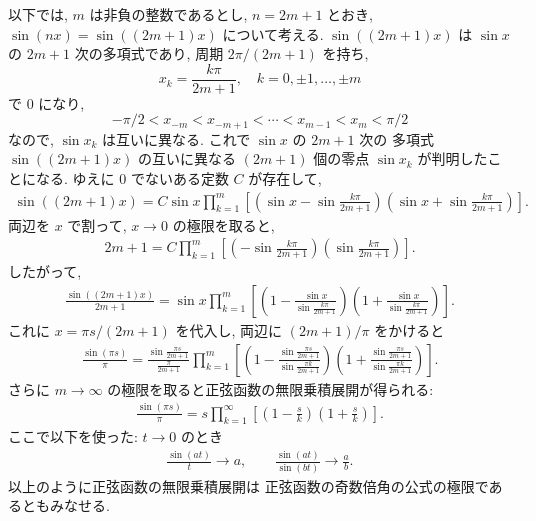 \documentclass[12pt,twoside]{jarticle}
\theoremstyle{jplain}
\theoremstyle{jplain}
\theoremstyle{jplain}
\numberwithin{theorem}{section}
\numberwithin{equation}{section}
\numberwithin{figure}{section}
\numberwithin{table}{section}
\begin{document}
以下では, $m$ は非負の整数であるとし, $n=2m+1$ とおき,
$\sin(nx)=\sin((2m+1)x)$ について考える.
$\sin((2m+1)x)$ は $\sin x$ の $2m+1$ 次の多項式であり,
周期 $2\pi/(2m+1)$ を持ち,
\begin{equation*}
x_k = \frac{k\pi}{2m+1}, \quad k=0,\pm1,\ldots,\pm m
\end{equation*}
で $0$ になり,
\begin{equation*}
  -\pi/2<x_{-m}<x_{-m+1}<\cdots<x_{m-1}<x_m<\pi/2
\end{equation*}
なので, $\sin x_k$ は互いに異なる. これで $\sin x$ の $2m+1$ 次の
多項式 $\sin((2m+1)x)$ の互いに異なる $(2m+1)$ 個の零点 $\sin x_k$
が判明したことになる. ゆえに $0$ でないある定数 $C$ が存在して,
\begin{align*}
  \sin((2m+1)x) =
  C \sin x
  \prod_{k=1}^m
  \left[
  \left(\sin x - \sin\frac{k\pi}{2m+1}\right)
  \left(\sin x + \sin\frac{k\pi}{2m+1}\right)
  \right].
\end{align*}
両辺を $x$ で割って, $x\to 0$ の極限を取ると,
\begin{align*}
  2m+1 = C
  \prod_{k=1}^m
  \left[
  \left(-\sin\frac{k\pi}{2m+1}\right)
  \left(\sin\frac{k\pi}{2m+1}\right)
  \right].
\end{align*}
したがって,
\begin{align*}
  \frac{\sin((2m+1)x)}{2m+1} =
  \sin x
  \prod_{k=1}^m
  \left[
  \left(1-\frac{\sin x}{\sin\frac{k\pi}{2m+1}}\right)
  \left(1+\frac{\sin x}{\sin\frac{k\pi}{2m+1}}\right)
  \right].
\end{align*}
これに $x=\pi s/(2m+1)$ を代入し, 両辺に $(2m+1)/\pi$ をかけると
\begin{align*}
  \frac{\sin(\pi s)}{\pi} =
  \frac{\sin\frac{\pi s}{2m+1}}{\frac{\pi}{2m+1}}
  \prod_{k=1}^m
  \left[
  \left(1-\frac{\sin\frac{\pi s}{2m+1}}{\sin\frac{\pi k}{2m+1}}\right)
  \left(1+\frac{\sin\frac{\pi s}{2m+1}}{\sin\frac{\pi k}{2m+1}}\right)
  \right].
\end{align*}
さらに $m\to\infty$ の極限を取ると正弦函数の無限乗積展開が得られる:
\begin{align*}
\frac{\sin(\pi s)}{\pi}
=s \prod_{k=1}^\infty\left[
\left(1-\frac{s}{k}\right)\left(1+\frac{s}{k}\right)
\right].
\end{align*}
ここで以下を使った: $t\to 0$ のとき
\begin{align*}
  \frac{\sin(at)}{t}\to a, \qquad
  \frac{\sin(at)}{\sin(bt)} \to \frac{a}{b}.
\end{align*}
以上のように正弦函数の無限乗積展開は
正弦函数の奇数倍角の公式の極限であるともみなせる.
\end{document}
